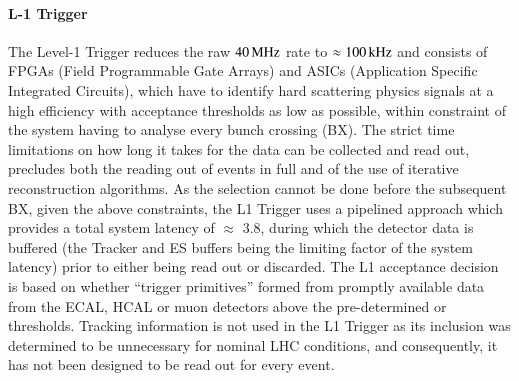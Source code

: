 \paragraph{L-1 Trigger}\label{paragraph:L1}
The Level-1 Trigger reduces the raw $40\text{\,MHz}$ rate to $\approx100\text{\,kHz}$ and consists of FPGAs (Field Programmable Gate Arrays) and ASICs (Application Specific Integrated Circuits), which have to identify hard scattering physics signals at a high efficiency with acceptance thresholds as low as possible, within constraint of the system having to analyse every bunch crossing (BX).
The strict time limitations on how long it takes for the data can be collected and read out, precludes both the reading out of events in full and of the use of iterative reconstruction algorithms.
As the selection cannot be done before the subsequent BX, given the above constraints, the L1 Trigger uses a pipelined approach which provides a total system latency of $\approx$ 3.8\mus, during which the detector data is buffered (the Tracker and ES buffers being the limiting factor of the system latency) prior to either being read out or discarded.
The L1 acceptance decision is based on whether ``trigger primitives'' formed from promptly available data from the ECAL, HCAL or muon detectors above the pre-determined \pT or \ET thresholds.
Tracking information is not used in the L1 Trigger as its inclusion was determined to be unnecessary for nominal LHC conditions, and consequently, it has not been designed to be read out for every event.

